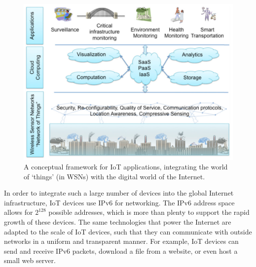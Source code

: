 \begin{figure}
    \centering
    \includegraphics[width=\textwidth]{images/gubbi-iot-framework.png}
    \caption[Conceptual framework for IoT applications]{A conceptual framework for \gls{IoT} applications, integrating the world of `things' (in \glspl{WSN}) with the digital world of the Internet. \cite{gubbi-iot-vision}}
    \label{fig:intro:iot:framework}
\end{figure}

In order to integrate such a large number of devices into the global Internet infrastructure, \gls{IoT} devices use \gls{IPv6} for networking. The \gls{IPv6} address space allows for $2^{128}$ possible addresses, which is more than plenty to support the rapid growth of these devices. The same technologies that power the Internet are adapted to the scale of \gls{IoT} devices, such that they can communicate with outside networks in a uniform and transparent manner. For example, \gls{IoT} devices can send and receive \gls{IPv6} packets, download a file from a website, or even host a small web server.


